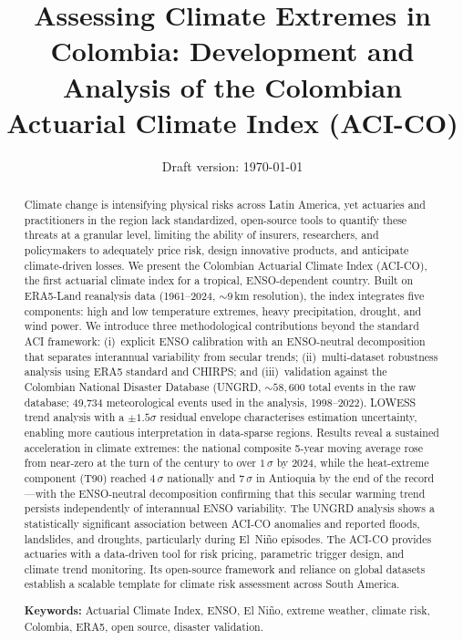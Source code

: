 \documentclass[12pt]{article}
\title{\textbf{Assessing Climate Extremes in Colombia: Development and Analysis of the Colombian Actuarial Climate Index (ACI-CO)}}
\date{Draft version: \today}
\begin{document}
\maketitle
\begin{abstract}
Climate change is intensifying physical risks across Latin America, yet actuaries and practitioners in the region lack standardized, open-source tools to quantify these threats at a granular level, limiting the ability of insurers, researchers, and policymakers to adequately price risk, design innovative products, and anticipate climate-driven losses. We present the Colombian Actuarial Climate Index (ACI-CO), the first actuarial climate index for a tropical, ENSO-dependent country. Built on ERA5-Land reanalysis data (1961--2024, ${\sim}9$\,km resolution), the index integrates five components: high and low temperature extremes, heavy precipitation, drought, and wind power. We introduce three methodological contributions beyond the standard ACI framework: (i)~explicit ENSO calibration with an ENSO-neutral decomposition that separates interannual variability from secular trends; (ii)~multi-dataset robustness analysis using ERA5 standard and CHIRPS; and (iii)~validation against the Colombian National Disaster Database (UNGRD, ${\sim}58{,}600$ total events in the raw database; 49{,}734 meteorological events used in the analysis, 1998--2022). LOWESS trend analysis with a $\pm 1.5\sigma$ residual envelope characterises estimation uncertainty, enabling more cautious interpretation in data-sparse regions. Results reveal a sustained acceleration in climate extremes: the national composite 5-year moving average rose from near-zero at the turn of the century to over $1\,\sigma$ by 2024, while the heat-extreme component (T90) reached $4\,\sigma$ nationally and $7\,\sigma$ in Antioquia by the end of the record---with the ENSO-neutral decomposition confirming that this secular warming trend persists independently of interannual ENSO variability. The UNGRD analysis shows a statistically significant association between ACI-CO anomalies and reported floods, landslides, and droughts, particularly during El~Ni\~no episodes. The ACI-CO provides actuaries with a data-driven tool for risk pricing, parametric trigger design, and climate trend monitoring. Its open-source framework and reliance on global datasets establish a scalable template for climate risk assessment across South America.
 
\medskip
\noindent\textbf{Keywords:} Actuarial Climate Index, ENSO, El Ni\~no, extreme weather, climate risk, Colombia, ERA5, open source, disaster validation.
\end{abstract}
 
\end{document}

